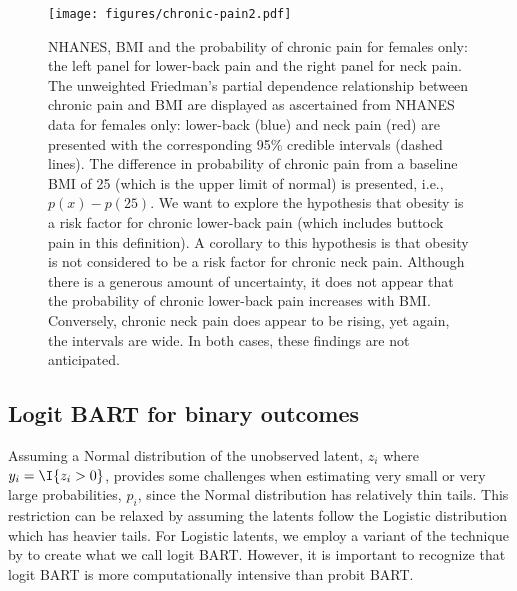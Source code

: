 \documentclass[article]{jss}
\begin{document}
\begin{figure}%
\begin{center}
\texttt{[image: figures/chronic-pain2.pdf]}
\end{center}
\caption{\label{chronic-pain2}NHANES, BMI and the probability of
  chronic pain for females only: the left panel for lower-back
  pain and the right panel for neck pain. The unweighted Friedman's
  partial dependence relationship between chronic pain and BMI are
  displayed as ascertained from NHANES data for females only:
  lower-back (blue) and neck pain (red) are presented with the
  corresponding 95\% credible intervals (dashed lines).  The
  difference in probability of chronic pain from a baseline BMI of 25
  (which is the upper limit of normal) is presented, i.e.,
  $p(x)-p(25)$.  We want to explore the hypothesis that obesity is a
  risk factor for chronic lower-back pain (which includes buttock pain
  in this definition).  A corollary to this hypothesis is that obesity
  is not considered to be a risk factor for chronic neck pain.
  Although there is a generous amount of uncertainty, it does not
  appear that the probability of chronic lower-back pain increases
  with BMI.  Conversely, chronic neck pain does appear to be rising,
  yet again, the intervals are wide.  In both cases, these findings
  are not anticipated. }
\end{figure}


\subsection{Logit BART for binary outcomes}

Assuming a Normal distribution of the unobserved latent, $z_i$ where
$y_i=\I{z_i>0}$, provides some challenges when estimating very small
or very large probabilities, $p_i$, since the Normal distribution has
relatively thin tails.  This restriction can be relaxed by assuming
the latents follow the Logistic distribution which has heavier tails. 
For Logistic latents, we employ a variant of the \citet{HolmHeld06}
technique by \citet{GramPols12} to create what we call logit BART.
However, it is important to recognize that logit BART is more
computationally intensive than probit BART.
  
\end{document}
